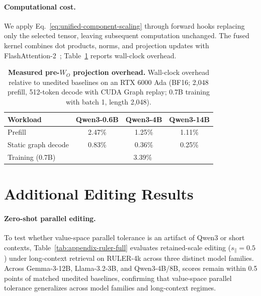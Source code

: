 \paragraph{Computational cost.}
We apply Eq.~\ref{eq:unified-component-scaling} through forward hooks replacing
only the selected tensor, leaving subsequent computation unchanged.
The fused kernel combines dot products, norms, and projection updates with
FlashAttention-2~\citep{dao2024flashattention2}; Table~\ref{tab:projection-overhead}
reports wall-clock overhead.

\begin{table}[H]
  \vspace{-2pt}
  \centering
  \scriptsize
  \setlength{\tabcolsep}{3.5pt}
  \caption{\textbf{Measured pre-\(W_O\) projection overhead.}
  Wall-clock overhead relative to unedited baselines on an RTX 6000 Ada (BF16; 2,048 prefill, 512-token decode with CUDA Graph replay; 0.7B training with batch 1, length 2,048).}
  \label{tab:projection-overhead}
  \begingroup
  \renewcommand{\arraystretch}{0.95}
  \begin{tabular}{lccc}
    \toprule
    Workload & Qwen3-0.6B & Qwen3-4B & Qwen3-14B \\
    \midrule
    Prefill & 2.47\% & 1.25\% & 1.11\% \\
    Static graph decode & 0.83\% & 0.36\% & 0.25\% \\
    \midrule
    Training (0.7B) & \multicolumn{3}{c}{3.39\%} \\
    \bottomrule
  \end{tabular}
  \endgroup
\end{table}

\newpage
\section{Additional Editing Results}
\label{app:additional-editing}

\paragraph{Zero-shot parallel editing.}
To test whether value-space parallel tolerance is an artifact of Qwen3
or short contexts, Table~\ref{tab:appendix-ruler-full} evaluates retained-scale
editing ($s_{\parallel}=0.5$) under long-context retrieval on RULER-4k across three distinct
model families. Across Gemma-3-12B, Llama-3.2-3B, and Qwen3-4B/8B, scores remain within 0.5
points of matched unedited baselines, confirming that value-space parallel tolerance generalizes
across model families and long-context regimes.


